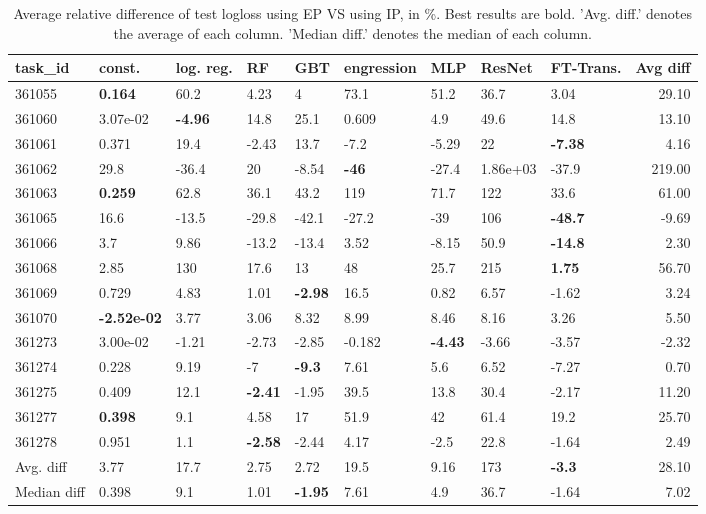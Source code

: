 \begin{table}[ht!]
\centering
\begingroup\footnotesize
\begin{tabular}{lllllllllr}
  \hline
\hline
task\_id & const. & log. reg. & RF & GBT & engression & MLP & ResNet & FT-Trans. & Avg diff \\ 
  \hline
361055 & \textbf{0.164} & 60.2 & 4.23 & 4 & 73.1 & 51.2 & 36.7 & 3.04 & 29.10 \\ 
  361060 &  3.07e-02 & \textbf{-4.96} & 14.8 & 25.1 & 0.609 & 4.9 & 49.6 & 14.8 & 13.10 \\ 
  361061 & 0.371 & 19.4 & -2.43 & 13.7 & -7.2 & -5.29 & 22 & \textbf{-7.38} & 4.16 \\ 
  361062 & 29.8 & -36.4 & 20 & -8.54 & \textbf{-46} & -27.4 &  1.86e+03 & -37.9 & 219.00 \\ 
  361063 & \textbf{0.259} & 62.8 & 36.1 & 43.2 & 119 & 71.7 & 122 & 33.6 & 61.00 \\ 
  361065 & 16.6 & -13.5 & -29.8 & -42.1 & -27.2 & -39 & 106 & \textbf{-48.7} & -9.69 \\ 
  361066 & 3.7 & 9.86 & -13.2 & -13.4 & 3.52 & -8.15 & 50.9 & \textbf{-14.8} & 2.30 \\ 
  361068 & 2.85 & 130 & 17.6 & 13 & 48 & 25.7 & 215 & \textbf{1.75} & 56.70 \\ 
  361069 & 0.729 & 4.83 & 1.01 & \textbf{-2.98} & 16.5 & 0.82 & 6.57 & -1.62 & 3.24 \\ 
  361070 & \textbf{-2.52e-02} & 3.77 & 3.06 & 8.32 & 8.99 & 8.46 & 8.16 & 3.26 & 5.50 \\ 
  361273 &  3.00e-02 & -1.21 & -2.73 & -2.85 & -0.182 & \textbf{-4.43} & -3.66 & -3.57 & -2.32 \\ 
  361274 & 0.228 & 9.19 & -7 & \textbf{-9.3} & 7.61 & 5.6 & 6.52 & -7.27 & 0.70 \\ 
  361275 & 0.409 & 12.1 & \textbf{-2.41} & -1.95 & 39.5 & 13.8 & 30.4 & -2.17 & 11.20 \\ 
  361277 & \textbf{0.398} & 9.1 & 4.58 & 17 & 51.9 & 42 & 61.4 & 19.2 & 25.70 \\ 
  361278 & 0.951 & 1.1 & \textbf{-2.58} & -2.44 & 4.17 & -2.5 & 22.8 & -1.64 & 2.49 \\ 
   \hline
Avg. diff & 3.77 & 17.7 & 2.75 & 2.72 & 19.5 & 9.16 & 173 & \textbf{-3.3} & 28.10 \\ 
  Median diff & 0.398 & 9.1 & 1.01 & \textbf{-1.95} & 7.61 & 4.9 & 36.7 & -1.64 & 7.02 \\ 
   \hline
\hline
\end{tabular}
\endgroup
\caption{Average relative difference of test logloss using EP VS using IP, in \%. 
                  Best results are bold. 
                  'Avg. diff.' denotes the average of each column.
                  'Median diff.' denotes the median of each column.} 
\label{TABLES/table_results_spatial_depth_logloss_only_num_features_EP_VS_IP}
\end{table}
